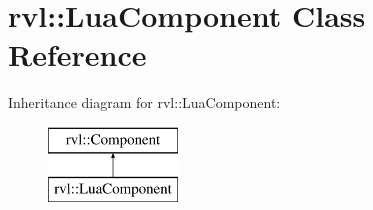 \hypertarget{classrvl_1_1_lua_component}{}\section{rvl\+:\+:Lua\+Component Class Reference}
\label{classrvl_1_1_lua_component}
Inheritance diagram for rvl\+:\+:Lua\+Component\+:\begin{figure}[H]
\begin{center}
\leavevmode
\includegraphics[height=2.000000cm]{classrvl_1_1_lua_component}
\end{center}
\end{figure}
